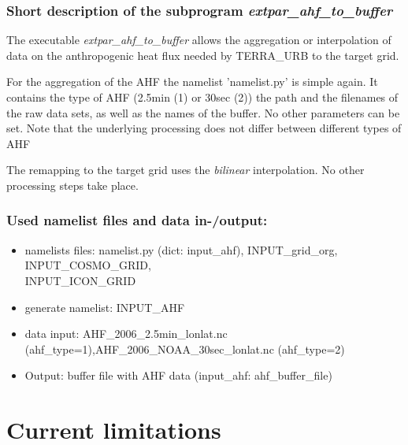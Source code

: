 \documentclass[a4paper,10pt,DIV14,BCOR1cm,titlepage,twoside]{scrartcl}
\begin{document}
\subsubsection{Short description of the subprogram \textit{extpar\_ahf\_to\_buffer}}
The executable \textit{extpar\_ahf\_to\_buffer} allows the aggregation or interpolation of data on the anthropogenic heat flux needed by TERRA\_URB to the target grid. \par\medskip\noindent
For the aggregation of the AHF the namelist 'namelist.py' is simple again. It contains the type of AHF (2.5min (1) or 30sec (2)) the path and the filenames of the raw data sets, as well as the names of the buffer. No other parameters can be set. Note that the underlying processing does not differ between different types of AHF \par\medskip\noindent
The remapping to the target grid uses the \textit{bilinear} interpolation. No other processing steps take place. 

\subsubsection{Used namelist files and data in-/output:}
\begin{itemize}
 \item namelists files: namelist.py (dict: input\_ahf), INPUT\_grid\_org, INPUT\_COSMO\_GRID, \\
       INPUT\_ICON\_GRID
 \item generate namelist: INPUT\_AHF
 \item data input: AHF\_2006\_2.5min\_lonlat.nc (ahf\_type=1),AHF\_2006\_NOAA\_30sec\_lonlat.nc (ahf\_type=2)
 \item Output: buffer file with AHF data (input\_ahf: ahf\_buffer\_file)
\end{itemize}

\section{Current limitations}
\end{document}

